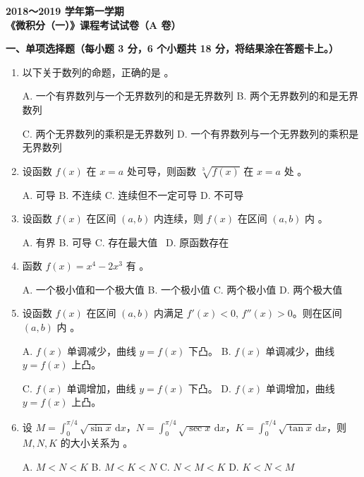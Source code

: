 \documentclass[a4paper,11pt]{ctexart}
\newcommand{\dd}{\,\mathrm{d}}
\newcommand{\choice}[1]{\text{【\quad】}}
\begin{document}
\begin{center}
  {\Large\bfseries 2018～2019 学年第一学期}\\[0.5em]
  {\Large\bfseries 《微积分（一）》课程考试试卷（A 卷）}
\end{center}

\vspace{0.8em}

\textbf{一、单项选择题（每小题 3 分，6 个小题共 18 分，将结果涂在答题卡上。）}

\begin{enumerate}[label=\arabic*., leftmargin=2em, itemsep=0.7em, topsep=0.6em]
  \item 以下关于数列的命题，正确的是 \choice{}。

  A. 一个有界数列与一个无界数列的和是无界数列 \quad
  B. 两个无界数列的和是无界数列

  C. 两个无界数列的乘积是无界数列 \quad
  D. 一个有界数列与一个无界数列的乘积是无界数列

  \item 设函数 $f(x)$ 在 $x=a$ 处可导，则函数 $\sqrt[3]{f(x)}$ 在 $x=a$ 处 \choice{}。

  A. 可导 \qquad\quad
  B. 不连续 \qquad\quad
  C. 连续但不一定可导 \qquad\quad
  D. 不可导

  \item 设函数 $f(x)$ 在区间 $(a,b)$ 内连续，则 $f(x)$ 在区间 $(a,b)$ 内 \choice{}。

  A. 有界 \qquad\quad
  B. 可导 \qquad\quad
  C. 存在最大值 \qquad\qquad\quad\ 
  D. 原函数存在

  \item 函数 $f(x)=x^4-2x^3$ 有 \choice{}。

  A. 一个极小值和一个极大值 \qquad
  B. 一个极小值 \qquad
  C. 两个极小值 \qquad
  D. 两个极大值

  \item 设函数 $f(x)$ 在区间 $(a,b)$ 内满足 $f'(x)<0,\,f''(x)>0$。则在区间 $(a,b)$ 内 \choice{}。

  A. $f(x)$ 单调减少，曲线 $y=f(x)$ 下凸。 \qquad
  B. $f(x)$ 单调减少，曲线 $y=f(x)$ 上凸。

  C. $f(x)$ 单调增加，曲线 $y=f(x)$ 下凸。 \qquad
  D. $f(x)$ 单调增加，曲线 $y=f(x)$ 上凸。

  \item 设 $M=\displaystyle\int_0^{\pi/4}\sqrt{\sin x}\dd x$，$N=\displaystyle\int_0^{\pi/4}\sqrt{\sec x}\dd x$，$K=\displaystyle\int_0^{\pi/4}\sqrt{\tan x}\dd x$，则 $M,N,K$ 的大小关系为 \choice{}。

  A. $M<N<K$ \qquad\quad
  B. $M<K<N$ \qquad\quad
  C. $N<M<K$ \qquad\quad
  D. $K<N<M$
\end{enumerate}
\end{document}

